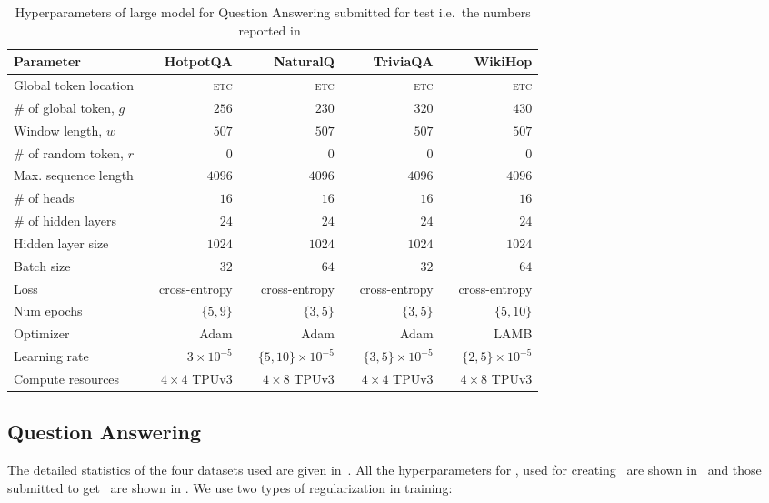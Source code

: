 \begin{table}[t]
\small
\centering
\begin{tabular}{@{}l c r c r c r c r@{}}
\toprule
Parameter & &  HotpotQA & & NaturalQ & & TriviaQA & & WikiHop \\
\midrule
Global token location & & \textsc{etc} & & \textsc{etc} & & \textsc{etc} & &\textsc{etc} \\
 $\#$ of global token, $g$ & & $256$ & & $230$ & & $320$ & & $430$  \\
 Window length, $w$  & & $507$ & & $507$ & & $507$ & & $507 $ \\
 $\#$ of random token, $r$ & & $0$ & & $0$ & & $0$ & & $0$ \\
 Max. sequence length & & $4096$ & & $4096$ & & $4096$ & & $4096$\\
 $\#$ of heads & & $16$ & & $16$ & & $16$ & & $16$\\
 $\#$ of hidden layers & & $24$ & & $24$ & & $24$ & & $24$ \\
 Hidden layer size & & $1024$ & & $1024$ & & $1024$ & & $1024$ \\
 Batch size & & $32$ & & $64$ & & $32$ & & $64$ \\
 Loss & & cross-entropy & & cross-entropy & & cross-entropy & & cross-entropy \\
 Num epochs & & $\{5, 9\}$ & & $\{3,5\}$ & & $\{3,5\}$ & & $\{5, 10\}$ \\
 Optimizer  & & Adam  & & Adam & & Adam & & LAMB\\
 Learning rate  & & $3\times 10^{-5}$ & & $\{5, 10\}\times 10^{-5}$ & & $\{3, 5\}\times 10^{-5}$ & & $\{2,5 \}\times 10^{-5}$ \\
 Compute resources & & $4 \times 4$ TPUv3 & & $4 \times 8$ TPUv3 & & $4 \times 4$ TPUv3 & & $4 \times 8$ TPUv3\\
\bottomrule
\end{tabular}
\vspace{2mm}
\caption{Hyperparameters of large \bigb model for Question Answering submitted for test i.e.~the numbers reported in~}
\label{tab:app_qa}
\end{table}

\subsection{Question Answering}
\label{sec:app-expt-nlp:qa}

The detailed statistics of the four datasets used are given in~. 
All the hyperparameters for \bigb, used for creating~ are shown in~ and those submitted to get~ 
are shown in . 
We use two types of regularization in training:


